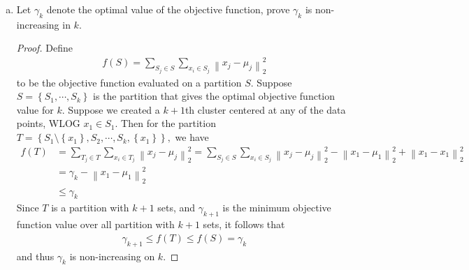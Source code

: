 \documentclass{article}
\begin{document}
	\begin{enumerate}[(a)]
		\item Let $\gamma_k$ denote the optimal value of the objective function, prove $\gamma_k$ is non-increasing in $k$.
			\begin{proof}
				Define
				\begin{align*}
					f(S) = \sum_{S_j\in S}^{}\sum_{x_i\in S_j}^{}\left\lVert x_j-\mu_j \right\rVert_2^2
				\end{align*}
				to be the objective function evaluated on a partition $S.$ Suppose $S=\left\{ S_1, \cdots, S_k \right\}$ is the partition that gives the optimal objective function value for $k.$ Suppose we created a $k+1$th cluster centered at any of the data points, WLOG $x_1\in S_1.$ Then for the partition $T=\left\{ S_1\setminus\left\{ x_1 \right\}, S_2, \cdots, S_k, \left\{ x_1 \right\} \right\},$ we have
				\begin{align*}
					f(T) &= \sum_{T_j\in T}^{}\sum_{x_i\in T_j}^{}\left\lVert x_j-\mu_j \right\rVert_2^2 = \sum_{S_j\in S}^{}\sum_{x_i\in S_j}^{}\left\lVert x_j-\mu_j \right\rVert_2^2 - \left\lVert x_1-\mu_1 \right\rVert_2^2 + \left\lVert x_1-x_1 \right\rVert_2^2 \\
					&= \gamma_k - \left\lVert x_1-\mu_1 \right\rVert_2^2 \\
					&\le \gamma_k
				\end{align*}
				Since $T$ is a partition with $k+1$ sets, and $\gamma_{k+1}$ is the minimum objective function value over all partition with $k+1$ sets, it follows that
				\begin{align*}
					\gamma_{k+1} \le f(T) \le f(S) = \gamma_{k}
				\end{align*}
				and thus $\gamma_k$ is non-increasing on $k.$
			\end{proof}


\end{enumerate}
\end{document}
